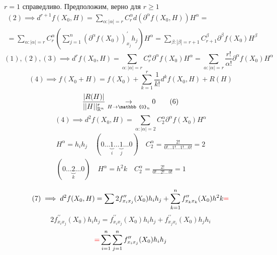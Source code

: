 \documentclass[main]{subfiles}
\begin{document}
        \begin{longProof}[по индукции]
            $r = 1$ справедливо. Предположим, верно для $r \geq 1$ 
            \begin{multline*}
                (2) \implies d^{r+1}f(X_0, H) = \sum_{\alpha: |\alpha| = r} C^\alpha_r d(\partial^\alpha f(X_0,H))H^\alpha = \\
                = \sum_{\alpha: |\alpha| = r} C^\alpha_r \left( \sum^n_{j=1} (\partial^\alpha f(X_0))^\prime_{x_j}h_j \right)H^\alpha = \sum_{\beta: |\beta|
                 = r+1} C_{r+1}^\beta \partial^\beta f(X_0) H^\beta 
            \end{multline*}
            \[ (1), (2), (3) \implies d^r f(X_0,H) = \sum_{\alpha: |\alpha| = r} C^\alpha_r \partial^\alpha f(X_0) H^\alpha =
             \sum_{\alpha: |\alpha|=r} \frac{r!}{\alpha!} \partial^\alpha f(X_0) H^\alpha \tag{4} \] 
            \[ (4) \implies f(X_0 + H) = f(X_0) + \sum^r_{k=1} \frac{1}{k!} d^k f(X_0, H) + R(H) \tag{5} \]
            \[ \frac{|R(H)|}{||H||^r_{\vR^n}} \underset{H \to \mathbb{0}_n}{\rightarrow} 0 \tag{6} \]
            \[ (4) \implies d^2f(X_0, H) = \sum_{\alpha : |\alpha| = 2} C^\alpha_2 \partial^\alpha f(X_0)H^\alpha \tag{7} \] 
            \begin{gather*}
                H^\alpha = h_i h_j \quad (0 \ldots \underbrace{1}_i \ldots \underbrace{1}_j \ldots 0) \quad C^\alpha_2 = \frac{2!}{0! \ldots 1! \ldots 1! \ldots 0!} = 2 \\
                (0 \ldots \underbrace{2}_k \ldots 0) \quad H^\alpha = h^2k\quad C^\alpha_2 = \frac{2!}{0! \ldots 2! \ldots 0!} = 1 \\
            \end{gather*}
               \[ (7) \implies d^2 f(X_0, H)= \sum 2 f^{\prime\prime}_{x_ix_j}(X_0) h_i h_j + \sum^n_{k=1}f^{\prime\prime}_{x_kx_k}(X_0)h^2 k \textcolor{red}{ =} \] 
               \[ 2f^{\prime\prime}_{x_ix_j}(X_0) h_ih_j = f^{\prime\prime}_{x_ix_j}(X_0)h_i h_j + f^{\prime\prime}_{x_jx_i}(X_0)h_j h_i \tag{8} \]
               \[ \textcolor{red}{ = } \sum^n_{i=1} \sum^n_{j=1} f^{\prime\prime}_{x_ix_j}(X_0) h_i h_j \]
        \end{longProof}
\end{document}
